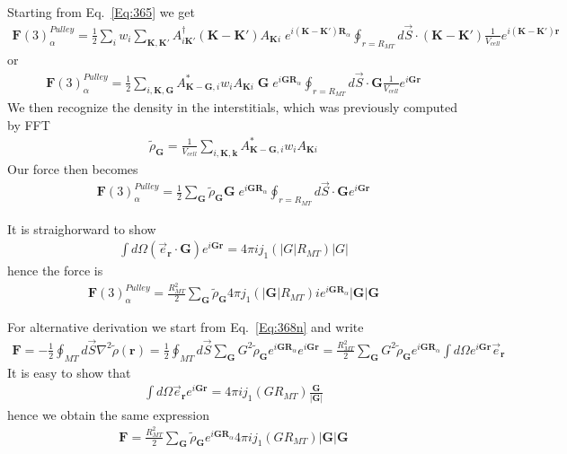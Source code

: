 \documentclass[aps,prb,floatfix,epsfig,singlecolumn,showpacs,preprintnumbers]{revtex4}
\newcommand{\vR}{{\mathbf{R}}}
\newcommand{\vF}{{\mathbf{F}}}
\renewcommand{\vr}{{\mathbf{r}}}
\newcommand{\vk}{{\mathbf{k}}}
\newcommand{\vK}{{\mathbf{K}}}
\newcommand{\vG}{{\mathbf{G}}}
\begin{document}
Starting from Eq.~\ref{Eq:365} we get
\begin{eqnarray}
\vF(3)^{Pulley}_\alpha = \frac{1}{2}\sum_i w_i \sum_{\vK,\vK'}
A_{i\vK'}^\dagger (\vK-\vK')   A_{\vK i}\; e^{i(\vK-\vK')\vR_\alpha}
\oint_{r=R_{MT}} d\vec{S} \cdot (\vK-\vK') \frac{1}{V_{cell}}e^{i(\vK-\vK')\vr}
\end{eqnarray}
or
\begin{eqnarray}
\vF(3)^{Pulley}_\alpha = \frac{1}{2}
\sum_{i,\vK,\vG} A_{\vK-\vG,i}^* w_i  A_{\vK i}\; 
\vG\; e^{i\vG \vR_\alpha}
\oint_{r=R_{MT}} d\vec{S} \cdot \vG \frac{1}{V_{cell}}e^{i\vG \vr}
\end{eqnarray}
We then recognize the density in the interstitials, which was
previously computed by FFT
\begin{eqnarray}
\tilde{\rho}_\vG = \frac{1}{V_{cell}}\sum_{i,\vK,\vk} A_{\vK-\vG,i}^* w_i  A_{\vK i}
\end{eqnarray}
Our force then becomes
\begin{eqnarray}
\vF(3)^{Pulley}_\alpha = \frac{1}{2}
\sum_{\vG} \tilde{\rho}_\vG \vG\; e^{i\vG \vR_\alpha}
\oint_{r=R_{MT}} d\vec{S} \cdot \vG e^{i\vG \vr}
\end{eqnarray}

It is straighorward to show 
\begin{eqnarray}
\int d\Omega (\vec{e}_\vr \cdot \vG) e^{i\vG\vr} = 4\pi i j_1(|G| R_{MT})|G|
\end{eqnarray}
hence the force is
\begin{eqnarray}
\vF(3)^{Pulley}_\alpha = \frac{R_{MT}^2}{2}
\sum_{\vG} \tilde{\rho}_\vG 4\pi j_1(|\vG| R_{MT})
i e^{i\vG \vR_\alpha}
|\vG| \vG
\end{eqnarray}

For alternative derivation we start from Eq.~\ref{Eq:368n} and write
\begin{eqnarray}
\vF = -\frac{1}{2}\oint_{MT}d\vec{S}\nabla^2\tilde{\rho}(\vr)=
\frac{1}{2}\oint_{MT}d\vec{S} \sum_\vG G^2 \tilde{\rho}_\vG e^{i\vG\vR_{\alpha}}e^{i\vG\vr}=
\frac{R_{MT}^2}{2}
\sum_\vG G^2 \tilde{\rho}_\vG e^{i\vG\vR_{\alpha}}
\int d\Omega e^{i\vG\vr}\vec{e}_\vr
\end{eqnarray}
It is easy to show that
\begin{eqnarray}
\int d\Omega \vec{e}_\vr e^{i\vG\vr} =4\pi i j_1(G R_{MT})\frac{\vG}{|\vG|}
\end{eqnarray}
hence we obtain the same expression
\begin{eqnarray}
\vF =\frac{R_{MT}^2}{2}
\sum_\vG \tilde{\rho}_\vG e^{i\vG\vR_{\alpha}}
4\pi i j_1(G R_{MT}) |\vG|\vG
\end{eqnarray}
\end{document}
